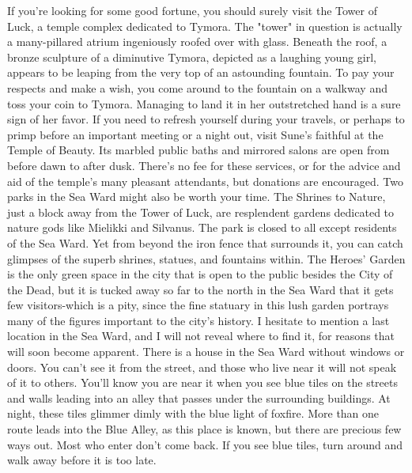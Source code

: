 \documentclass[10pt,a4paper,twoside,twocolumn,openany,nodeprecatedcode]{dndbook}
\begin{document}
If you're looking for some good fortune, you should surely visit the Tower of Luck, a temple complex dedicated to Tymora. The "tower" in question is actually a many-pillared atrium ingeniously roofed over with glass. Beneath the roof, a bronze sculpture of a diminutive Tymora, depicted as a laughing young girl, appears to be leaping from the very top of an astounding fountain. To pay your respects and make a wish, you come around to the fountain on a walkway and toss your coin to Tymora. Managing to land it in her outstretched hand is a sure sign of her favor.
If you need to refresh yourself during your travels, or perhaps to primp before an important meeting or a night out, visit Sune's faithful at the Temple of Beauty. Its marbled public baths and mirrored salons are open from before dawn to after dusk. There's no fee for these services, or for the advice and aid of the temple's many pleasant attendants, but donations are encouraged.
Two parks in the Sea Ward might also be worth your time. The Shrines to Nature, just a block away from the Tower of Luck, are resplendent gardens dedicated to nature gods like Mielikki and Silvanus. The park is closed to all except residents of the Sea Ward. Yet from beyond the iron fence that surrounds it, you can catch glimpses of the superb shrines, statues, and fountains within. The Heroes' Garden is the only green space in the city that is open to the public besides the City of the Dead, but it is tucked away so far to the north in the Sea Ward that it gets few visitors-which is a pity, since the fine statuary in this lush garden portrays many of the figures important to the city's history.
I hesitate to mention a last location in the Sea Ward, and I will not reveal where to find it, for reasons that will soon become apparent. There is a house in the Sea Ward without windows or doors. You can't see it from the street, and those who live near it will not speak of it to others. You'll know you are near it when you see blue tiles on the streets and walls leading into an alley that passes under the surrounding buildings. At night, these tiles glimmer dimly with the blue light of foxfire. More than one route leads into the Blue Alley, as this place is known, but there are precious few ways out. Most who enter don't come back. If you see blue tiles, turn around and walk away before it is too late.
\end{document}
